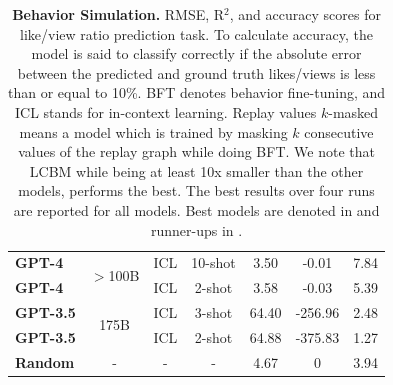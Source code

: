 \begin{center}
\begin{table}[tbp]
\begin{center}
\begin{adjustbox}{max width=\textwidth}
\begin{tabular}{lcccccc}
\textbf{GPT-4} &\multirow{2}{*}{$>$100B\footnotemark[2]} & ICL & 10-shot & 3.50 & -0.01 & 7.84\\
\textbf{GPT-4}& & ICL & 2-shot & 3.58 & -0.03 & 5.39\\\hline
\textbf{GPT-3.5}& \multirow{2}{*}{175B} & ICL & 3-shot & 64.40 & -256.96 & 2.48\\
\textbf{GPT-3.5} & & ICL & 2-shot & 64.88 & -375.83 & 1.27\\\hline
\textbf{Random} & - & - & - & 4.67 & 0 & 3.94 \\\hline
\bottomrule[1.5pt]
\end{tabular}
\end{adjustbox}
\end{center}
\caption{\textbf{Behavior Simulation.} RMSE, R$^2$, and accuracy scores for like/view ratio prediction task. To calculate accuracy, the model is said to classify correctly if the absolute error between the predicted and ground truth likes/views is less than or equal to 10\%. BFT denotes behavior fine-tuning, and ICL stands for in-context learning. Replay values $k$-masked means a model which is trained by masking $k$ consecutive values of the replay graph while doing BFT. We note that LCBM while being at least 10x smaller than the other models, performs the best. The best results over four runs are reported for all models. Best models are denoted in  and runner-ups in . \label{table:behavior-simulation-like-simulation}}
\end{table}
\end{center}
